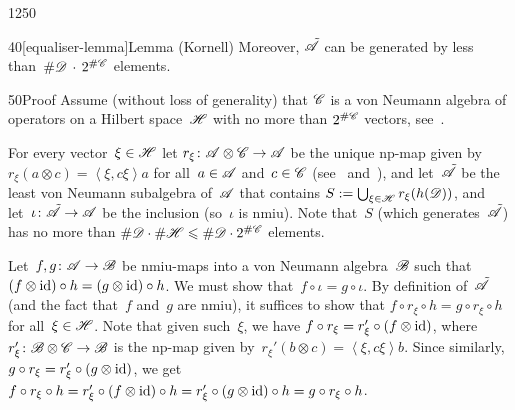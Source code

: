 \begin{parsec}{1250}
\begin{point}{40}[equaliser-lemma]{Lemma (Kornell)}
Moreover,
$\tilde{\mathscr{A}}$
can be generated by
less than~$\#\mathscr{D}\,\cdot\,2^{\#\mathscr{C}}$ elements.
\begin{point}{50}{Proof}%
Assume (without loss of generality)
that
$\mathscr{C}$
is a von Neumann algebra of operators on
a Hilbert space~$\mathscr{H}$
with no more than $2^{\#\mathscr{C}}$ vectors, see~.

For every vector~$\xi\in \mathscr{H}$
let
$r_\xi\colon \mathscr{A}\otimes \mathscr{C}\to\mathscr{A}$
be the unique np-map
given by~$r_\xi(a\otimes c) = \left<\xi,c\xi\right> a$
for all~$a\in\mathscr{A}$ and~$c\in \mathscr{C}$
(see~
and~),
and
let~$\tilde{\mathscr{A}}$
be the least von Neumann subalgebra
of~$\mathscr{A}$
that contains $S:=\smash{ \bigcup_{\xi \in\mathscr{H}} r_\xi(h(\mathscr{D}))}$,
and let~$\iota\colon \tilde{\mathscr{A}}\to\mathscr{A}$
be the inclusion
(so~$\iota$ is nmiu).
Note that~$S$ (which generates~$\tilde{\mathscr{A}}$)
has no more than $\#\mathscr{D}\cdot\#\mathscr{H}\leqslant \#\mathscr{D} \cdot 2^{\#\mathscr{C}}$
elements.

Let~$f,g\colon \mathscr{A}\to\mathscr{B}$
be nmiu-maps
into a von Neumann algebra~$\mathscr{B}$
such that $(f\otimes\mathrm{id})\circ h = (g\otimes \mathrm{id})\circ h$.
We must show that~$f\circ \iota = g\circ \iota$.
By definition of~$\tilde{\mathscr{A}}$
(and the fact that~$f$ and~$g$ are nmiu),
it suffices to show that $f\circ r_\xi\circ h=g\circ r_\xi\circ h$
for all~$\xi\in\mathscr{H}$.
Note that given such~$\xi$,
we have $f\circ r_\xi = r_\xi' \circ (f\otimes\mathrm{id})$,
where~$r_\xi'\colon \mathscr{B}\otimes\mathscr{C}\to\mathscr{B}$
is the np-map
given by~$r_\xi'(b\otimes c)=\left<\xi,c\xi\right>b$.
Since similarly,
$g\circ r_\xi = r_\xi'\circ (g\otimes \mathrm{id})$,
we get~$f\circ r_\xi \circ h
= r_\xi' \circ (f\otimes \mathrm{id})\circ h
= r_\xi' \circ (g\otimes \mathrm{id})\circ h
= g\circ r_\xi \circ h$.


\end{point}
\end{point}
\end{parsec}

